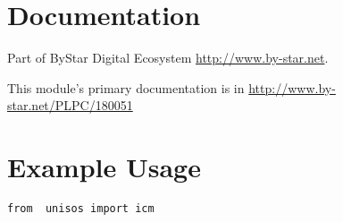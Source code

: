 \documentclass{article}
\begin{document}
\section{Documentation}

Part of ByStar Digital Ecosystem \url{http://www.by-star.net}.

This module's primary documentation is in  \url{http://www.by-star.net/PLPC/180051}


\section{Example Usage}

\begin{verbatim}
from  unisos import icm
\end{verbatim}

\begin{comment}
*  [[elisp:(org-cycle)][| ]]  *DBLK: main-end*                                       :: [[elisp:(beginning-of-buffer)][Top]] [[elisp:(delete-other-windows)][(1)]]  [[elisp:(org-cycle)][| ]]
\end{comment}
\end{document}
